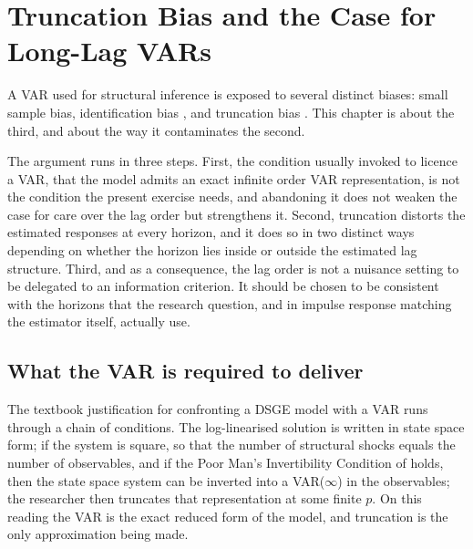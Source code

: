 
\section{Truncation Bias and the Case for Long-Lag VARs}
\label{sec:truncation}

A VAR used for structural inference is exposed to several distinct biases: small sample bias,
identification bias \citep{Forni_Gambetti_Sala2016}, and truncation bias \citep{Long_Lag2025,
Ravenna2007, ChariKehoeMcGrattan2008}. This chapter is about the third, and about the way it
contaminates the second.

The argument runs in three steps. First, the condition usually invoked to licence a VAR, that
the model admits an exact infinite order VAR representation, is not the condition the present
exercise needs, and abandoning it does not weaken the case for care over the lag order but
strengthens it. Second, truncation distorts the estimated responses at every horizon, and it
does so in two distinct ways depending on whether the horizon lies inside or outside the
estimated lag structure. Third, and as a consequence, the lag order is not a nuisance setting
to be delegated to an information criterion. It should be chosen to be consistent with the
horizons that the research question, and in impulse response matching the estimator itself,
actually use.

\subsection{What the VAR is required to deliver}
\label{sec:whatrequired}

The textbook justification for confronting a DSGE model with a VAR runs through a chain of
conditions. The log-linearised solution is written in state space form; if the system is
square, so that the number of structural shocks equals the number of observables, and if the
Poor Man's Invertibility Condition of \citet{FVRRS2005} holds, then the state space system can
be inverted into a VAR($\infty$) in the observables; the researcher then truncates that
representation at some finite $p$. On this reading the VAR is the exact reduced form of the
model, and truncation is the only approximation being made.

